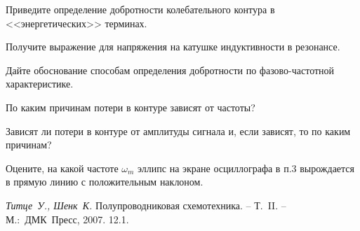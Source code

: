 
\begin{lab:questions}

    \item[1.]   Приведите определение добротности колебательного контура в <<энергетических>> терминах.

    \item[2.]   Получите выражение для напряжения на катушке индуктивности  в резонансе.

    \item[3.]Дайте обоснование способам определения добротности по фазово-частотной характеристике.

    \item[4.] По каким причинам потери в контуре зависят от частоты?

    \item[5.*] Зависят ли потери в контуре от амплитуды сигнала и, если зависят, то по каким причинам?

    \item[6.*] Оцените, на какой частоте $\omega_m$ эллипс на экране осциллографа в п.3 вырождается в прямую линию с положительным наклоном.
\end{lab:questions}



\begin{lab:literature}
    \item[1.] \emph{Титце~У., Шенк~К.} Полупроводниковая схемотехника.  – Т.~II. – М.:~ДМК~Пресс, 2007. 12.1.
\end{lab:literature}
